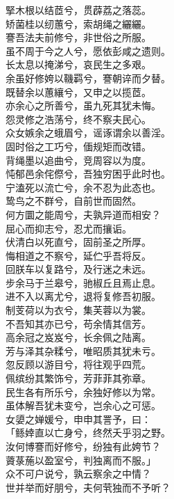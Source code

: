 \documentclass[]{article}
\begin{document}
掔木根以结茝兮，贯薜荔之落蕊。\\
矫菌桂以纫蕙兮，索胡绳之纚纚。\\
謇吾法夫前修兮，非世俗之所服。\\
虽不周于今之人兮，愿依彭咸之遗则。\\
长太息以掩涕兮，哀民生之多艰。\\
余虽好修姱以鞿羁兮，謇朝谇而夕替。\\
既替余以蕙纕兮，又申之以揽茝。\\
亦余心之所善兮，虽九死其犹未悔。\\
怨灵修之浩荡兮，终不察夫民心。\\
众女嫉余之蛾眉兮，谣诼谓余以善淫。\\
固时俗之工巧兮，偭规矩而改错。\\
背绳墨以追曲兮，竞周容以为度。\\
忳郁邑余侘傺兮，吾独穷困乎此时也。\\
宁溘死以流亡兮，余不忍为此态也。\\
鸷鸟之不群兮，自前世而固然。\\
何方圜之能周兮，夫孰异道而相安？\\
屈心而抑志兮，忍尤而攘诟。\\
伏清白以死直兮，固前圣之所厚。\\
悔相道之不察兮，延伫乎吾将反。\\
回朕车以复路兮，及行迷之未远。\\
步余马于兰皋兮，驰椒丘且焉止息。\\
进不入以离尤兮，退将复修吾初服。\\
制芰荷以为衣兮，集芙蓉以为裳。\\
不吾知其亦已兮，苟余情其信芳。\\
高余冠之岌岌兮，长余佩之陆离。\\
芳与泽其杂糅兮，唯昭质其犹未亏。\\
忽反顾以游目兮，将往观乎四荒。\\
佩缤纷其繁饰兮，芳菲菲其弥章。\\
民生各有所乐兮，余独好修以为常。\\
虽体解吾犹未变兮，岂余心之可惩。\\
女嬃之婵媛兮，申申其詈予，曰：\\
「鲧婞直以亡身兮，终然夭乎羽之野。\\
汝何博謇而好修兮，纷独有此姱节？\\
薋菉葹以盈室兮，判独离而不服。」\\
众不可户说兮，孰云察余之中情？\\
世并举而好朋兮，夫何茕独而不予听？\\
\end{document}
